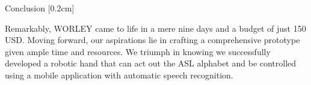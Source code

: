 \documentclass[final, 20pt]{beamer}
\newlength{\colwidth}
\begin{document}
\begin{frame}[t]
\begin{columns}[t]
\begin{column}{\colwidth}
\begin{block}{Conclusion}
    [0.2cm]

    Remarkably, WORLEY came to life in a mere nine days and a budget of just 150 USD. Moving forward, our aspirations lie in crafting a comprehensive prototype given ample time and resources. We triumph in knowing we successfully developed a robotic hand that can act out the ASL alphabet and be controlled using a mobile application with automatic speech recognition.

  \end{block}
\end{column}

\margincolumn
\end{columns}

\end{frame}
\end{document}
